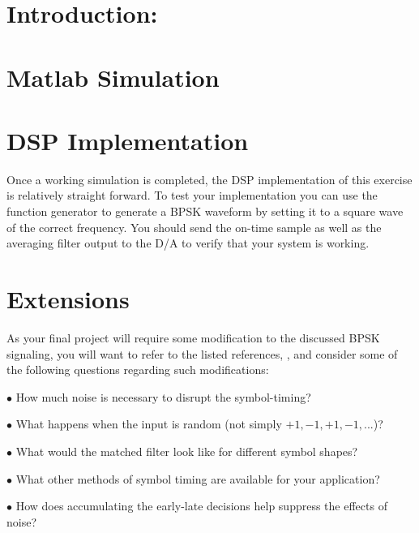 \documentclass[11pt]{handout}
\begin{document}
\setlength{\baselineskip}{0.5cm}
\setlength{\parskip}{0.5cm}

\makeboxtitle
\vspace{0.3cm}

\section{Introduction:}



\section{Matlab Simulation}



\section{DSP Implementation}

Once a working \matlab simulation is completed, the DSP implementation 
of this exercise is relatively straight forward.  To test your
implementation you can use the function generator to generate
a BPSK waveform by setting it to a square wave of the correct 
frequency.  
You should send the on-time sample as well as the averaging filter output
to the D/A to verify that your system is working. 

\section{Extensions}

As your final project will require some modification to the discussed
BPSK signaling, you will want to refer to the listed references,
\cite{Proakis1, Blahut1}, and
consider some of the following questions regarding such modifications:

$\bullet$ How much noise is necessary to disrupt the symbol-timing?

$\bullet$ What happens when the input is random 
          (not simply $+1, -1, +1, -1, ...$)?

$\bullet$ What would the matched filter look like for different symbol shapes?
 
$\bullet$ What other methods of symbol timing are available for your 
          application?

$\bullet$ How does accumulating the early-late decisions help suppress the 
          effects of noise?




\end{document}
